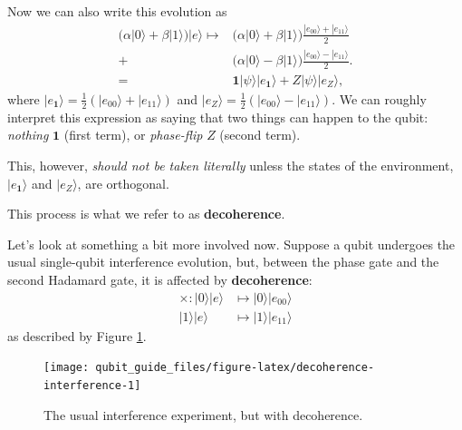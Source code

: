 \documentclass[fleqn,a4paper]{article}
\renewcommand{\footnote}[1]{\sidenotetext[{\color{white}0}\!\!]{\footnotesize #1}}
\newenvironment{idea}{\everypar{\setlength{\parindent}{1.5em}}}{}
\theoremstyle{definition}
\theoremstyle{definition}
\theoremstyle{definition}
\theoremstyle{definition}
\theoremstyle{remark}
\begin{document}
Now we can also write this evolution as
\[
  \begin{aligned}
    \Big( \alpha|0\rangle + \beta|1\rangle \Big) |e\rangle
    \longmapsto
    & \Big( \alpha|0\rangle + \beta|1\rangle \Big) \frac{|e_{00}\rangle+|e_{11}\rangle}{2}
  \\+& \Big( \alpha|0\rangle - \beta|1\rangle \Big) \frac{|e_{00}\rangle-|e_{11}\rangle}{2}.
  \\=& \mathbf{1}|\psi\rangle|e_{\mathbf{1}}\rangle + Z|\psi\rangle|e_Z\rangle,
  \end{aligned}
\]
where \(|e_{\mathbf{1}}\rangle = \frac{1}{2}(|e_{00}\rangle + |e_{11}\rangle)\) and \(|e_Z\rangle = \frac{1}{2}(|e_{00}\rangle - |e_{11}\rangle)\).
We can roughly interpret this expression as saying that two things can happen to the qubit: \emph{nothing} \(\mathbf{1}\) (first term), or \emph{phase-flip} \(Z\) (second term).

This, however, \emph{should not be taken literally} unless the states of the environment, \(|e_{\mathbf{1}}\rangle\) and \(|e_Z\rangle\), are orthogonal.\footnote{\textbf{Exercise.} Why not?}

\begin{idea}
This process is what we refer to as \textbf{decoherence}.

\end{idea}

Let's look at something a bit more involved now.
Suppose a qubit undergoes the usual single-qubit interference evolution, but, between the phase gate and the second Hadamard gate, it is affected by \textbf{decoherence}:
\[
  \begin{aligned}
    \times\colon
    |0\rangle|e\rangle
    &\longmapsto |0\rangle|e_{00}\rangle
  \\|1\rangle|e\rangle
    &\longmapsto |1\rangle|e_{11}\rangle
  \end{aligned}
\]
as described by Figure \ref{fig:decoherence-interference}.

\begin{figure}[H]

{\centering \texttt{[image: qubit\_guide\_files/figure-latex/decoherence-interference-1]} 

}

\caption{The usual interference experiment, but with decoherence.}\label{fig:decoherence-interference}
\end{figure}
\end{document}
